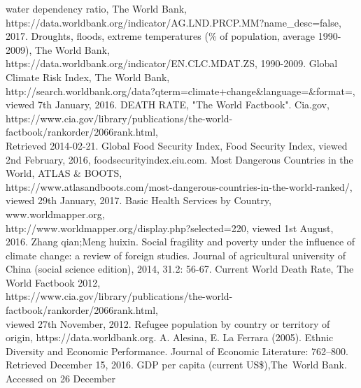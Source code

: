 \documentclass{mcmthesis}
\begin{document}

\newpage
\begin{thebibliography}{99}
 water dependency ratio, The World Bank, \\ 
https://data.worldbank.org/indicator/AG.LND.PRCP.MM?name\_desc=false, 
2017.
 Droughts, floods, extreme temperatures (\% of 
population, average 1990-2009), The World Bank, 
https://data.worldbank.org/indicator/EN.CLC.MDAT.ZS, 1990-2009.
 Global Climate Risk Index, The World Bank,\\
http://search.worldbank.org/data?qterm=climate+change\&language=\&format=,
\\viewed 7th January, 2016.
 DEATH RATE, "The World Factbook". Cia.gov, 
\\https://www.cia.gov/library/publications/the-world-factbook/rankorder/2066rank.html,\\ 
Retrieved 2014-02-21.
 Global Food Security Index, Food Security Index, viewed 2nd February, 2016, foodsecurityindex.eiu.com.
 Most Dangerous Countries in the World, ATLAS \& BOOTS,\\ 
https://www.atlasandboots.com/most-dangerous-countries-in-the-world-ranked/, \\
viewed 29th January, 2017.
 Basic Health Services by Country, www.worldmapper.org, \\
http://www.worldmapper.org/display.php?selected=220, viewed 1st August, 2016.
 Zhang qian;Meng huixin. Social fragility and 
poverty under the influence of climate change: a review of foreign studies. 
Journal of agricultural university of China (social science edition), 2014, 31.2: 56-67.
 Current World Death Rate, The World Factbook 2012,\\ 
https://www.cia.gov/library/publications/the-world-factbook/rankorder/2066rank.html, \\
viewed 27th November, 2012.
 Refugee population by country or territory of origin, https://data.worldbank.org.
 A. Alesina, E. La Ferrara (2005). Ethnic Diversity and Economic 
Performance. Journal of Economic Literature: 762–800. Retrieved December 15, 2016.
 GDP per capita (current US\$),The World Bank. Accessed on 26 December 

\end{thebibliography}
\end{document}
